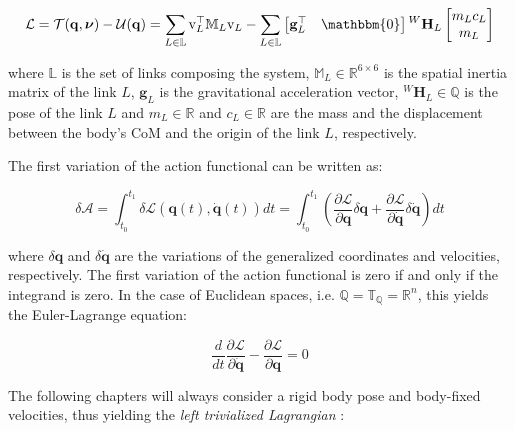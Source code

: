 \begin{equation}
    \mathcal{L} = \mathcal{T}(\mathbf{q},\boldsymbol{\nu}) - \mathcal{U}(\mathbf{q}) = \sum _{L \in \mathbb{L}} \mathrm{v} ^\top _L \mathbb{M} _L \mathrm{v} _L - \sum _{L \in \mathbb{L}} \begin{bmatrix}
        \mathbf{g} ^\top _L & \mathbbm{0}
    \end{bmatrix} {}^W\mathbf{H} _L
    \begin{bmatrix}
        m _L c _L \\ m _L
    \end{bmatrix}
\end{equation}

where $\mathbb{L}$ is the set of links composing the system, $\mathbb{M} _L \in \mathbb{R} ^{6 \times 6}$ is the spatial inertia matrix of the link $L$, $\mathbf{g} _L$ is the gravitational acceleration vector, ${}^W\mathbf{H} _L \in \mathbb{Q}$ is the pose of the link $L$ and $m _L \in \mathbb{R}$ and $c _L \in \mathbb{R}$ are the mass and the displacement between the body's \ac{CoM} and the origin of the link $L$, respectively.

The first variation of the action functional can be written as:

\begin{equation}
    \delta \mathcal{A} = \int _{t _0} ^{t _1} \delta \mathcal{L} (\mathbf{q}(t), \mathbf{\dot{q}}(t))dt = \int _{t _0} ^{t _1} \left( \frac{\partial \mathcal{L}}{\partial \mathbf{q}} \delta \mathbf{q} + \frac{\partial \mathcal{L}}{\partial \mathbf{\dot{q}}} \delta \mathbf{\dot{q}} \right) dt
\end{equation}

where $\delta \mathbf{q}$ and $\delta \mathbf{\dot{q}}$ are the variations of the generalized coordinates and velocities, respectively. The first variation of the action functional is zero if and only if the integrand is zero. In the case of Euclidean spaces, i.e. $\mathbb{Q} = \mathbb{T} _{\mathbb{Q}} =\mathbb{R} ^n$, this yields the Euler-Lagrange equation:

\begin{equation}
    \frac{d}{dt} \frac{\partial \mathcal{L}}{\partial \mathbf{\dot{q}}} - \frac{\partial \mathcal{L}}{\partial \mathbf{q}} = 0
    \label{eqn:lagrangian}
\end{equation}

The following chapters will always consider a rigid body pose and body-fixed velocities, thus yielding the \textit{left trivialized Lagrangian} \citep{traversaro_modelling_2019}:

